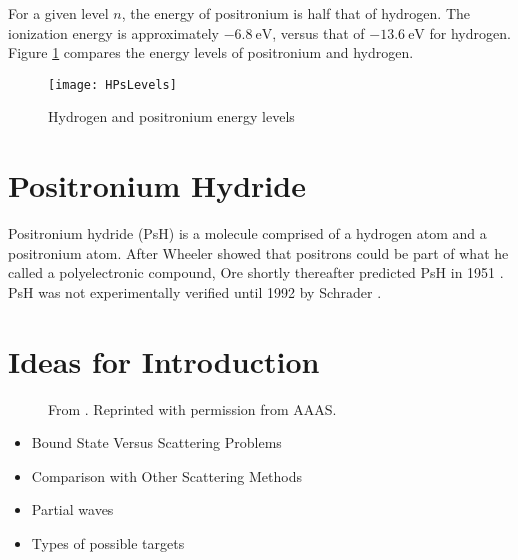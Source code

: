 \documentclass[Dissertation.tex]{subfiles}
\begin{document}
For a given level $n$, the energy of positronium is half that of hydrogen. The ionization energy is approximately $\SI{-6.8}{\eV}$, versus that of $\SI{-13.6}{\eV}$ for hydrogen. Figure \ref{fig:HPsLevels} compares the energy levels of positronium and hydrogen.
\begin{figure}[H]
	\centering
	\texttt{[image: HPsLevels]}
	\caption{Hydrogen and positronium energy levels}
	\label{fig:HPsLevels}
\end{figure}

\section{Positronium Hydride}
\label{sec:PsH}
Positronium hydride (PsH) is a molecule  comprised of a hydrogen atom and a positronium atom. After Wheeler \cite{Wheeler1946} showed that positrons could be part of what he called a polyelectronic compound, Ore shortly thereafter predicted PsH in 1951 \cite{Ore1951}. PsH was not experimentally verified until 1992 by Schrader \cite{Schrader1992}. 






\section{Ideas for Introduction}

\begin{figure}[H]
	\centering
	\caption{From \cite{Brawley2010a}. Reprinted with permission from AAAS.}
	\label{fig:ScienceBrawley}
\end{figure}

\begin{itemize}
	\item Bound State Versus Scattering Problems
	\item Comparison with Other Scattering Methods
	\item Partial waves
	\item Types of possible targets
\end{itemize}

\end{document}

